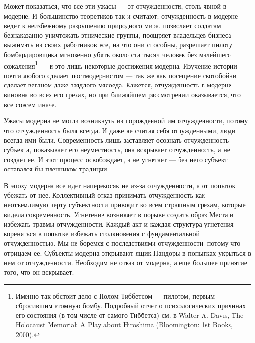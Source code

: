 \documentclass[12pt]{book}
\begin{document}
Может показаться, что все эти ужасы --- от отчужденности, столь явной в модерне. И большинство теоретиков так и считают: отчужденность в модерне ведет к неизбежному разрушению природного мира, позволяет солдатам безнаказанно уничтожать этнические группы, поощряет владельцев бизнеса выжимать из своих работников все, на что они способны, разрешает пилоту бомбардировщика мгновенно убить около ста тысяч человек без малейшего сожаления\footnote{Именно так обстоит дело с Полом Тиббетсом --- пилотом, первым сбросившим атомную бомбу. Подробный отчет о психологических причинах его состояния (в том числе от самого Тиббетса) см. в Walter A. Davis, The Holocaust Memorial: A Play about Hiroshima (Bloomington: 1st Books, 2000).} --- и это лишь некоторые достижения модерна. Изучение истории почти любого сделает постмодернистом --- так же как посещение скотобойни сделает веганом даже заядлого мясоеда. Кажется, отчужденность в модерне виновна во всех его грехах, но при ближайшем рассмотрении оказывается, что все совсем иначе.

Ужасы модерна не могли возникнуть из порожденной им отчужденности, потому что отчужденность была всегда. И даже не считая себя отчужденными, люди всегда ими были. Современность лишь заставляет осознать отчужденность субъекта, показывает его неуместность, она вскрывает отчужденность, а не создает ее. И этот процесс освобождает, а не угнетает --- без него субъект оставался бы пленником традиции.

В эпоху модерна все идет наперекосяк не из-за отчужденности, а от попыток убежать от нее. Коллективный отказ принимать отчужденность как неотъемлимую черту субъектности приводит ко всем страшным грехам, которые видела современность. Угнетение возникает в порыве создать образ Места и избежать травмы отчужденности. Каждый акт и каждая структура угнетения кореняться в попытке избежать столкновения с фундаментальной отчужденностью. Мы не боремся с последствиями отчужденности, потому что отрицаем ее. Субъекты модерна открывают ящик Пандоры в попытках укрыться в нем от отчужденности. Необходим не отказ от модерна, а еще большее принятие того, что он вскрывает.
\end{document}

